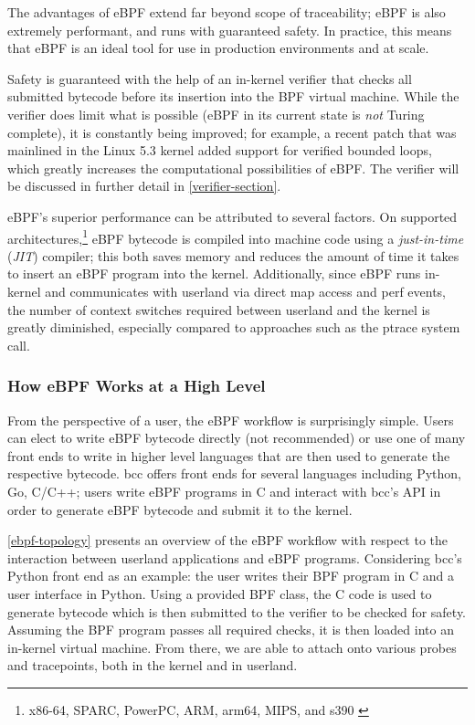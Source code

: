 \documentclass[
  12pt]{findlay}
\begin{document}
The advantages of eBPF extend far beyond scope of traceability; eBPF is
also extremely performant, and runs with guaranteed safety. In practice,
this means that eBPF is an ideal tool for use in production environments
and at scale.

Safety is guaranteed with the help of an in-kernel verifier that checks
all submitted bytecode before its insertion into the BPF virtual
machine. While the verifier does limit what is possible (eBPF in its
current state is \emph{not} Turing complete), it is constantly being
improved; for example, a recent patch \autocite{starovoitov19} that was
mainlined in the Linux 5.3 kernel added support for verified bounded
loops, which greatly increases the computational possibilities of eBPF.
The verifier will be discussed in further detail in
\autoref{verifier-section}.

eBPF's superior performance can be attributed to several factors. On
supported
architectures,\footnote{x86-64, SPARC, PowerPC, ARM, arm64, MIPS, and s390 \cite{fleming17}}
eBPF bytecode is compiled into machine code using a \emph{just-in-time}
(\emph{JIT}) compiler; this both saves memory and reduces the amount of
time it takes to insert an eBPF program into the kernel. Additionally,
since eBPF runs in-kernel and communicates with userland via direct map
access and perf events, the number of context switches required between
userland and the kernel is greatly diminished, especially compared to
approaches such as the ptrace system call.

\hypertarget{how-ebpf-works-at-a-high-level}{%
\subsubsection{How eBPF Works at a High
Level}\label{how-ebpf-works-at-a-high-level}}

From the perspective of a user, the eBPF workflow is surprisingly
simple. Users can elect to write eBPF bytecode directly (not
recommended) or use one of many front ends to write in higher level
languages that are then used to generate the respective bytecode. bcc
\autocite{bcc} offers front ends for several languages including Python,
Go, C/C++; users write eBPF programs in C and interact with bcc's API in
order to generate eBPF bytecode and submit it to the kernel.

\autoref{ebpf-topology} presents an overview of the eBPF workflow with
respect to the interaction between userland applications and eBPF
programs. Considering bcc's Python front end as an example: the user
writes their BPF program in C and a user interface in Python. Using a
provided BPF class, the C code is used to generate bytecode which is
then submitted to the verifier to be checked for safety. Assuming the
BPF program passes all required checks, it is then loaded into an
in-kernel virtual machine. From there, we are able to attach onto
various probes and tracepoints, both in the kernel and in userland.
\end{document}
